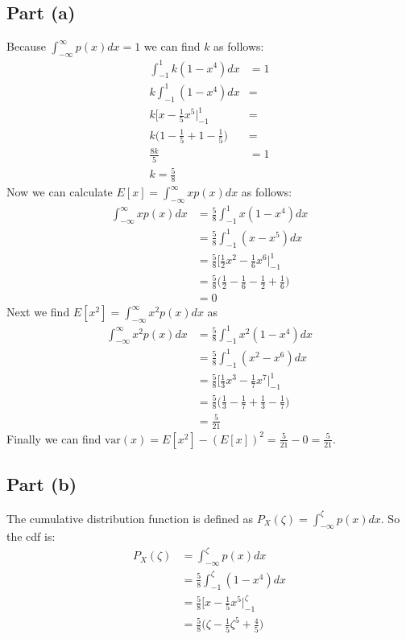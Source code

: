 \documentclass[11pt]{article}
\begin{document}
\subsection*{Part (a)}
Because $\int_{-\infty}^\infty p(x)dx = 1$ we can find $k$ as follows:
\begin{align*}
	\int_{-1}^1 k(1-x^4)dx &= 1 \\
	k\int_{-1}^1(1-x^4)dx &= \\
	k \big[x-\frac{1}{5}x^5 \big|_{-1}^1 &= \\
	k\Big(1-\frac{1}{5}+1-\frac{1}{5}\Big) &= \\
	\frac{8k}{5} &= 1 \\
	k = \frac{5}{8}
\end{align*}
Now we can calculate $E[x] = \int_{-\infty}^\infty xp(x)dx$ as follows:
\begin{align*}
	\int_{-\infty}^\infty xp(x)dx &= \frac{5}{8}\int_{-1}^1x(1-x^4)dx \\
	&= \frac{5}{8}\int_{-1}^1(x-x^5)dx \\
	&= \frac{5}{8} \Bigg[\frac{1}{2}x^2 - \frac{1}{6}x^6 \Bigg|_{-1}^1 \\
	&= \frac{5}{8} \Bigg(\frac{1}{2} - \frac{1}{6} - \frac{1}{2} + \frac{1}{6}\Bigg) \\
	&= 0
\end{align*}
Next we find $E[x^2] = \int_{-\infty}^\infty x^2p(x)dx$ as
\begin{align*}
	\int_{-\infty}^\infty x^2p(x)dx &= \frac{5}{8}\int_{-1}^1x^2(1-x^4)dx \\
	&= \frac{5}{8}\int_{-1}^1(x^2-x^6)dx \\
	&= \frac{5}{8} \Bigg[\frac{1}{3}x^3 - \frac{1}{7}x^7 \Bigg|_{-1}^1 \\
	&= \frac{5}{8} \Bigg(\frac{1}{3} - \frac{1}{7} + \frac{1}{3} - \frac{1}{7}\Bigg) \\
	&= \frac{5}{21}
\end{align*}
Finally we can find $\text{var}(x) = E[x^2]-(E[x])^2 = \frac{5}{21}-0=\frac{5}{21}$.

\subsection*{Part (b)}
The cumulative distribution function is defined as $P_X(\zeta)=\int_{-\infty}^\zeta p(x)dx$. So the cdf is:
\begin{align*}
	P_X(\zeta)&=\int_{-\infty}^\zeta p(x)dx \\
	&= \frac{5}{8}\int_{-1}^\zeta (1-x^4)dx \\
	&= \frac{5}{8} \Big[x-\frac{1}{5}x^5\Big|_{-1}^\zeta \\
	&= \frac{5}{8} \Big(\zeta - \frac{1}{5}\zeta^5 + \frac{4}{5}\Big)
\end{align*}
\end{document}
